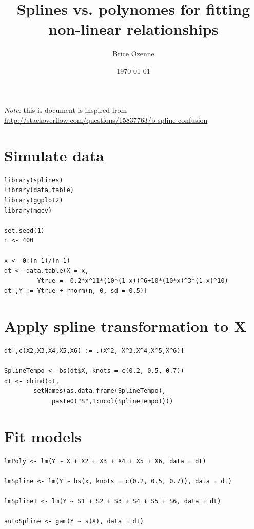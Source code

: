 \documentclass[12pt]{article}
\author{Brice Ozenne}
\date{\today}
\title{Splines vs. polynomes for fitting non-linear relationships}
\begin{document}
\maketitle
\bigskip

\emph{Note:} this is document is inspired from \url{http://stackoverflow.com/questions/15837763/b-spline-confusion}

\section{Simulate data}
\label{sec:org2393f30}
\begin{lstlisting}
library(splines)
library(data.table)
library(ggplot2)
library(mgcv)

set.seed(1)
n <- 400

x <- 0:(n-1)/(n-1)
dt <- data.table(X = x, 
		 Ytrue =  0.2*x^11*(10*(1-x))^6+10*(10*x)^3*(1-x)^10)
dt[,Y := Ytrue + rnorm(n, 0, sd = 0.5)]
\end{lstlisting}

\section{Apply spline transformation to X}
\label{sec:org6e5eff5}
\begin{lstlisting}
dt[,c(X2,X3,X4,X5,X6) := .(X^2, X^3,X^4,X^5,X^6)]

SplineTempo <- bs(dt$X, knots = c(0.2, 0.5, 0.7))
dt <- cbind(dt, 
	    setNames(as.data.frame(SplineTempo), 
		     paste0("S",1:ncol(SplineTempo))))
\end{lstlisting}

\section{Fit models}
\label{sec:org8bd6f41}

\begin{lstlisting}
lmPoly <- lm(Y ~ X + X2 + X3 + X4 + X5 + X6, data = dt)

lmSpline <- lm(Y ~ bs(x, knots = c(0.2, 0.5, 0.7)), data = dt)

lmSplineI <- lm(Y ~ S1 + S2 + S3 + S4 + S5 + S6, data = dt)

autoSpline <- gam(Y ~ s(X), data = dt)
\end{lstlisting}
\end{document}
